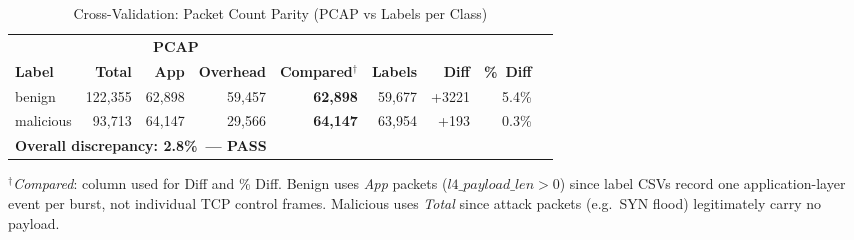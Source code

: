 \begin{table}[htbp]
\centering
\caption{Cross-Validation: Packet Count Parity (PCAP vs Labels per Class)}\label{tab:cv_count_parity}
\begin{tabular}{lrrrrrrrr}
\toprule
\multicolumn{1}{l}{} & \multicolumn{3}{c}{\textbf{PCAP}} & \multicolumn{1}{c}{} & \multicolumn{1}{c}{} & \multicolumn{2}{c}{} \\
\cmidrule(lr){2-4}
\textbf{Label} & \textbf{Total} & \textbf{App} & \textbf{Overhead} & \textbf{Compared$^\dagger$} & \textbf{Labels} & \textbf{Diff} & \textbf{\%\ Diff} \\
\midrule
benign & 122,355 & 62,898 & 59,457 & \textbf{62,898} & 59,677 & +3221 & 5.4\% \\
malicious & 93,713 & 64,147 & 29,566 & \textbf{64,147} & 63,954 & +193 & 0.3\% \\
\midrule
\multicolumn{6}{l}{\textbf{Overall discrepancy: 2.8\%\ — PASS}} & & \\
\bottomrule
\end{tabular}
\vspace{2mm}
\footnotesize{$^\dagger$\textit{Compared}: column used for Diff and \% Diff. Benign uses \textit{App} packets ($l4\_payload\_len > 0$) since label CSVs record one application-layer event per burst, not individual TCP control frames. Malicious uses \textit{Total} since attack packets (e.g.\ SYN flood) legitimately carry no payload.}
\end{table}
